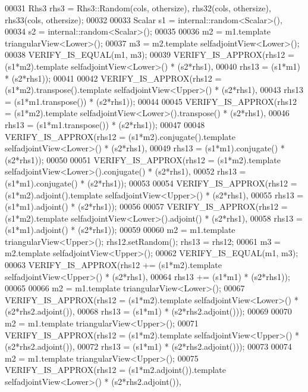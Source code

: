 \begin{DoxyCode}
00031   Rhs3 rhs3 = Rhs3::Random(cols, othersize), rhs32(cols, othersize), rhs33(cols, othersize);
00032 
00033   Scalar s1 = internal::random<Scalar>(),
00034          s2 = internal::random<Scalar>();
00035 
00036   m2 = m1.template triangularView<Lower>();
00037   m3 = m2.template selfadjointView<Lower>();
00038   VERIFY\_IS\_EQUAL(m1, m3);
00039   VERIFY\_IS\_APPROX(rhs12 = (s1*m2).\textcolor{keyword}{template} selfadjointView<Lower>() * (s2*rhs1),
00040                    rhs13 = (s1*m1) * (s2*rhs1));
00041 
00042   VERIFY\_IS\_APPROX(rhs12 = (s1*m2).transpose().\textcolor{keyword}{template} selfadjointView<Upper>() * (s2*rhs1),
00043                    rhs13 = (s1*m1.transpose()) * (s2*rhs1));
00044 
00045   VERIFY\_IS\_APPROX(rhs12 = (s1*m2).\textcolor{keyword}{template} selfadjointView<Lower>().transpose() * (s2*rhs1),
00046                    rhs13 = (s1*m1.transpose()) * (s2*rhs1));
00047 
00048   VERIFY\_IS\_APPROX(rhs12 = (s1*m2).conjugate().\textcolor{keyword}{template} selfadjointView<Lower>() * (s2*rhs1),
00049                    rhs13 = (s1*m1).conjugate() * (s2*rhs1));
00050 
00051   VERIFY\_IS\_APPROX(rhs12 = (s1*m2).\textcolor{keyword}{template} selfadjointView<Lower>().conjugate() * (s2*rhs1),
00052                    rhs13 = (s1*m1).conjugate() * (s2*rhs1));
00053 
00054   VERIFY\_IS\_APPROX(rhs12 = (s1*m2).adjoint().\textcolor{keyword}{template} selfadjointView<Upper>() * (s2*rhs1),
00055                    rhs13 = (s1*m1).adjoint() * (s2*rhs1));
00056 
00057   VERIFY\_IS\_APPROX(rhs12 = (s1*m2).\textcolor{keyword}{template} selfadjointView<Lower>().adjoint() * (s2*rhs1),
00058                    rhs13 = (s1*m1).adjoint() * (s2*rhs1));
00059 
00060   m2 = m1.template triangularView<Upper>(); rhs12.setRandom(); rhs13 = rhs12;
00061   m3 = m2.template selfadjointView<Upper>();
00062   VERIFY\_IS\_EQUAL(m1, m3);
00063   VERIFY\_IS\_APPROX(rhs12 += (s1*m2).\textcolor{keyword}{template} selfadjointView<Upper>() * (s2*rhs1),
00064                    rhs13 += (s1*m1) * (s2*rhs1));
00065 
00066   m2 = m1.template triangularView<Lower>();
00067   VERIFY\_IS\_APPROX(rhs12 = (s1*m2).\textcolor{keyword}{template} selfadjointView<Lower>() * (s2*rhs2.adjoint()),
00068                    rhs13 = (s1*m1) * (s2*rhs2.adjoint()));
00069 
00070   m2 = m1.template triangularView<Upper>();
00071   VERIFY\_IS\_APPROX(rhs12 = (s1*m2).\textcolor{keyword}{template} selfadjointView<Upper>() * (s2*rhs2.adjoint()),
00072                    rhs13 = (s1*m1) * (s2*rhs2.adjoint()));
00073 
00074   m2 = m1.template triangularView<Upper>();
00075   VERIFY\_IS\_APPROX(rhs12 = (s1*m2.adjoint()).\textcolor{keyword}{template} selfadjointView<Lower>() * (s2*rhs2.adjoint()),

\end{DoxyCode}
